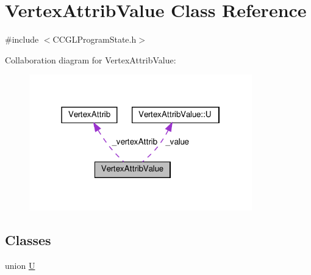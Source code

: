 \hypertarget{classVertexAttribValue}{}\section{Vertex\+Attrib\+Value Class Reference}
\label{classVertexAttribValue}


{\ttfamily \#include $<$C\+C\+G\+L\+Program\+State.\+h$>$}



Collaboration diagram for Vertex\+Attrib\+Value\+:
\nopagebreak
\begin{figure}[H]
\begin{center}
\leavevmode
\includegraphics[width=274pt]{classVertexAttribValue__coll__graph}
\end{center}
\end{figure}
\subsection*{Classes}
\begin{DoxyCompactItemize}
\item 
union \hyperlink{unionVertexAttribValue_1_1U}{U}
\end{DoxyCompactItemize}
